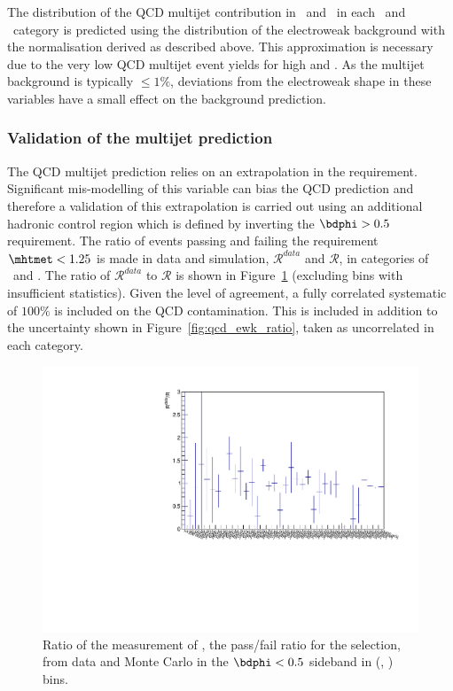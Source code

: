 The distribution of the QCD multijet contribution in \nb~and \mht~in each \scalht~and \njet~category
is predicted using the distribution of the electroweak background with the normalisation
derived as described above. This approximation is necessary due to the very low QCD multijet
event yields for high \nb and \mht. As the multijet background is typically $\le 1\%$, 
deviations from the electroweak shape in these variables have a small effect on the background prediction.

\subsubsection{Validation of the multijet prediction}

The QCD multijet prediction relies on an extrapolation in the \mhtmet requirement.
Significant mis-modelling of this variable can bias the QCD prediction and therefore a validation
of this extrapolation is carried out using an additional hadronic control 
region which is defined by inverting the $\bdphi > 0.5$ requirement. The ratio of events passing and failing 
the requirement $\mhtmet < 1.25$ is made in data and simulation, $\mathcal{R}^{data}$ and $\mathcal{R}$,
in categories of \njet~and \scalht. The ratio of $\mathcal{R}^{data}$ to $\mathcal{R}$ is shown in
Figure~\ref{fig:RR_qcd} (excluding bins with insufficient statistics). 
Given the level of agreement, a fully correlated systematic of $100\%$ is included on
the QCD contamination. This is included in addition to the uncertainty shown in 
Figure~\ref{fig:qcd_ewk_ratio}, taken as uncorrelated in each category.

\begin{figure}[h!]
  \begin{center}        
    \includegraphics[width=\textwidth]{figures/qcd/plots/doubleQcdSbSrRatio1D}
    \caption{ Ratio of the measurement of \rmhtmet, the pass/fail ratio for the \mhtmet selection, from data and Monte Carlo in the $\bdphi < 0.5$ sideband in (\scalht, \njet) bins.  
    }
    \label{fig:RR_qcd}
  \end{center} 
\end{figure}

